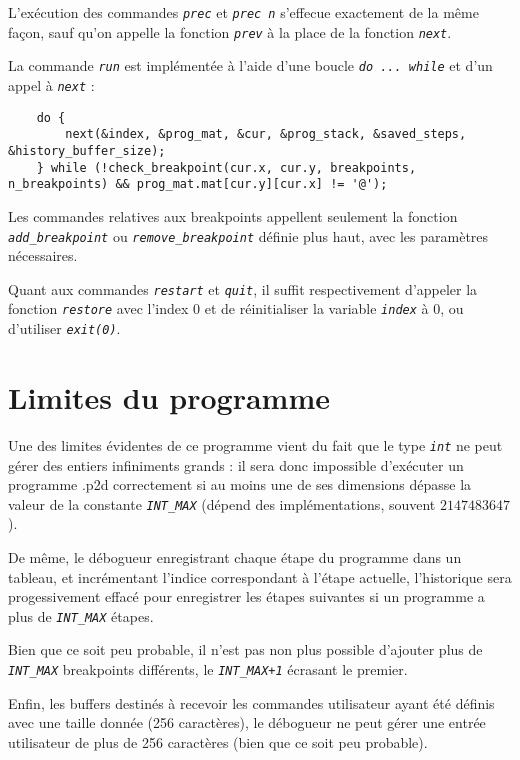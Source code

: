\documentclass[a4paper,11pt]{article}
\newcommand{\code}[1]{{\itshape\lstinline{#1}}}
\begin{document}
L'exécution des commandes \code{prec} et \code{prec n} s'effecue exactement de la même façon, sauf qu'on appelle la fonction \code{prev} à la place de la fonction \code{next}.

\bigskip

La commande \code{run} est implémentée à l'aide d'une boucle \code{do ... while} et d'un appel à \code{next} :
{\scriptsize\begin{lstlisting}
    do {
        next(&index, &prog_mat, &cur, &prog_stack, &saved_steps, &history_buffer_size);
    } while (!check_breakpoint(cur.x, cur.y, breakpoints, n_breakpoints) && prog_mat.mat[cur.y][cur.x] != '@');
\end{lstlisting}}

Les commandes relatives aux breakpoints appellent seulement la fonction \code{add_breakpoint} ou \code{remove_breakpoint} définie plus haut, avec les paramètres nécessaires.

\bigskip

Quant aux commandes \code{restart} et \code{quit}, il suffit respectivement d'appeler la fonction \code{restore} avec l'index 0 et de réinitialiser la variable \code{index} à 0, ou d'utiliser \code{exit(0)}.


\section*{Limites du programme}

Une des limites évidentes de ce programme vient du fait que le type \code{int} ne peut gérer des entiers infiniments grands : il sera donc impossible d'exécuter un programme .p2d correctement si au moins une de ses dimensions dépasse la valeur de la constante \code{INT_MAX} (dépend des implémentations, souvent $2 147 483 647$).

De même, le débogueur enregistrant chaque étape du programme dans un tableau, et incrémentant l'indice correspondant à l'étape actuelle, l'historique sera progessivement effacé pour enregistrer les étapes suivantes si un programme a plus de \code{INT_MAX} étapes.

Bien que ce soit peu probable, il n'est pas non plus possible d'ajouter plus de \code{INT_MAX} breakpoints différents, le \code{INT_MAX+1} écrasant le premier.

\bigskip

Enfin, les buffers destinés à recevoir les commandes utilisateur ayant été définis avec une taille donnée (256 caractères), le débogueur ne peut gérer une entrée utilisateur de plus de 256 caractères (bien que ce soit peu probable).
\end{document}
